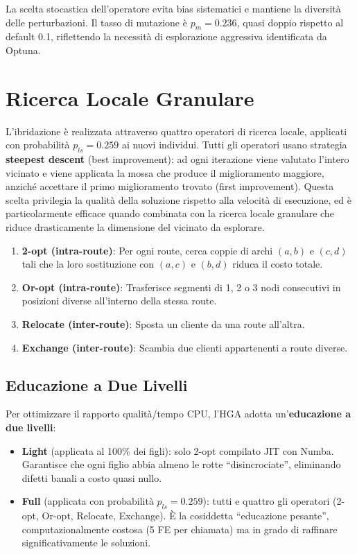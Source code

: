 La scelta stocastica dell'operatore evita bias sistematici e mantiene la diversit\`a
delle perturbazioni. Il tasso di mutazione \`e $p_m = 0.236$, quasi doppio rispetto
al default 0.1, riflettendo la necessit\`a di esplorazione aggressiva identificata
da Optuna.

\section{Ricerca Locale Granulare}

L'ibridazione \`e realizzata attraverso quattro operatori di ricerca locale, applicati
con probabilit\`a $p_{ls} = 0.259$ ai nuovi individui. Tutti gli operatori usano
strategia \textbf{steepest descent} (best improvement): ad ogni iterazione viene
valutato l'intero vicinato e viene applicata la mossa che produce il miglioramento
maggiore, anzich\'e accettare il primo miglioramento trovato (first improvement).
Questa scelta privilegia la qualit\`a della soluzione rispetto alla velocit\`a di
esecuzione, ed \`e particolarmente efficace quando combinata con la ricerca locale
granulare che riduce drasticamente la dimensione del vicinato da esplorare.

\begin{enumerate}[label=\textbf{\arabic*.}]
    \item \textbf{2-opt (intra-route)}: Per ogni route, cerca coppie di archi $(a,b)$
          e $(c,d)$ tali che la loro sostituzione con $(a,c)$ e $(b,d)$ riduca il
          costo totale.
    \item \textbf{Or-opt (intra-route)}: Trasferisce segmenti di 1, 2 o 3 nodi
          consecutivi in posizioni diverse all'interno della stessa route.
    \item \textbf{Relocate (inter-route)}: Sposta un cliente da una route all'altra.
    \item \textbf{Exchange (inter-route)}: Scambia due clienti appartenenti a route
          diverse.
\end{enumerate}

\subsection{Educazione a Due Livelli}

Per ottimizzare il rapporto qualit\`a/tempo CPU, l'HGA adotta un'\textbf{educazione
a due livelli}:
\begin{itemize}
    \item \textbf{Light} (applicata al 100\% dei figli): solo 2-opt compilato JIT
          con Numba. Garantisce che ogni figlio abbia almeno le rotte
          ``disincrociate'', eliminando difetti banali a costo quasi nullo.
    \item \textbf{Full} (applicata con probabilit\`a $p_{ls} = 0.259$): tutti e
          quattro gli operatori (2-opt, Or-opt, Relocate, Exchange). \`E la
          cosiddetta ``educazione pesante'', computazionalmente costosa (5 FE per
          chiamata) ma in grado di raffinare significativamente le soluzioni.
\end{itemize}


